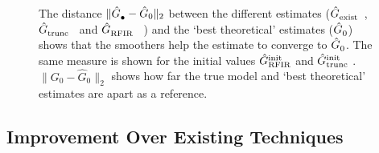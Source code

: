 \begin{figure}
  \centering
  \setlength{\figurewidth}{0.8\columnwidth}
  \setlength{\figureheight}{0.6\figurewidth}
  
 \caption[Model error for different initialization schemes on simulations.]{The distance $\|\model{\bullet} - \hat{G}_0 \|_2$  between the different estimates ($\model{exist}$~, $\model{trunc}$~ and $\model{RFIR}$~ ) and the `best theoretical' estimates ($\model{0}$) shows that the smoothers help the estimate to converge to $\model{0}$.
 The same measure is shown for the initial values $\model[init]{RFIR}$  and $\model[init]{trunc}$ .
 $\|{G}_{0} - \hat{G}_0\|_2$ shows how far the true model and `best theoretical' estimates are apart as a reference. }
  \label{fig:single-sim}
\end{figure}

\subsection{Improvement Over Existing Techniques}


